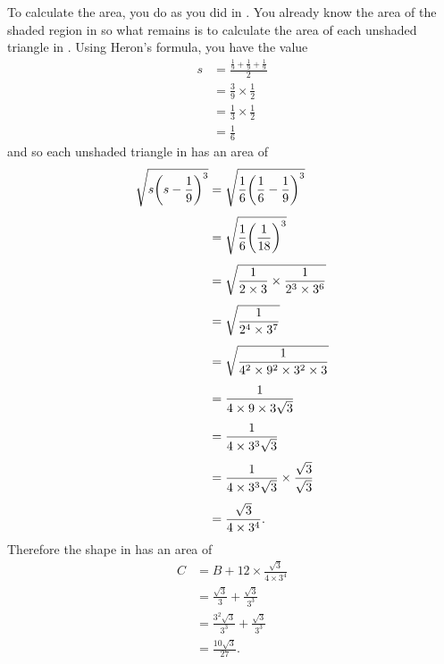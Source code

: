 \documentclass[a4paper,oneside,12pt]{article}
\begin{document}
\begin{problem}
{\begin{solution}
To calculate the area, you do as you did
in .  You already know
the area of the shaded region in
 so what
remains is to calculate the area of each unshaded triangle in
.  Using
Heron's formula, you have the value
\begin{align*}
s
&=
\frac{
  \frac{1}{9} + \frac{1}{9} + \frac{1}{9}
}{
  2
} \\[4pt]
&=
\frac{3}{9} \times \frac{1}{2} \\[4pt]
&=
\frac{1}{3} \times \frac{1}{2} \\[4pt]
&=
\frac{1}{6}
\end{align*}
and so each unshaded triangle in
 has an area
of
\begin{align*}
\sqrt{
  s \parenthesis*{s - \frac{1}{9}}^3
}
&=
\sqrt{
  \frac{1}{6} \parenthesis*{\frac{1}{6} - \frac{1}{9}}^3
} \\[4pt]
&=
\sqrt{
  \frac{1}{6} \parenthesis*{\frac{1}{18}}^3
} \\[4pt]
&=
\sqrt{
  \frac{1}{2 \times 3} \times \frac{1}{2^3 \times 3^6}
} \\[4pt]
&=
\sqrt{
  \frac{1}{2^4 \times 3^7}
} \\[4pt]
&=
\sqrt{
  \frac{1}{4^2 \times 9^2 \times 3^2 \times 3}
} \\[4pt]
&=
\frac{1}{
  4 \times 9 \times 3
  \sqrt{
    3
  }
} \\[4pt]
&=
\frac{1}{
  4 \times 3^3
  \sqrt{
    3
  }
} \\[4pt]
&=
\frac{1}{
  4 \times 3^3
  \sqrt{
    3
  }
}
\times
\frac{\sqrt{3}}{\sqrt{3}} \\[4pt]
&=
\frac{\sqrt{3}}{
  4 \times 3^4
}.
\end{align*}
Therefore the shape in 
has an area of
\begin{align*}
C
&=
B
+
12 \times \frac{\sqrt{3}}{
  4 \times 3^4
} \\[4pt]
&=
\frac{\sqrt{3}}{3}
+
\frac{\sqrt{3}}{
  3^3
} \\[4pt]
&=
\frac{3^2 \sqrt{3}}{3^3}
+
\frac{\sqrt{3}}{
  3^3
} \\[4pt]
&=
\frac{10\sqrt{3}}{27}.
\end{align*}
\end{solution}
}{}
\end{problem}
\end{document}
